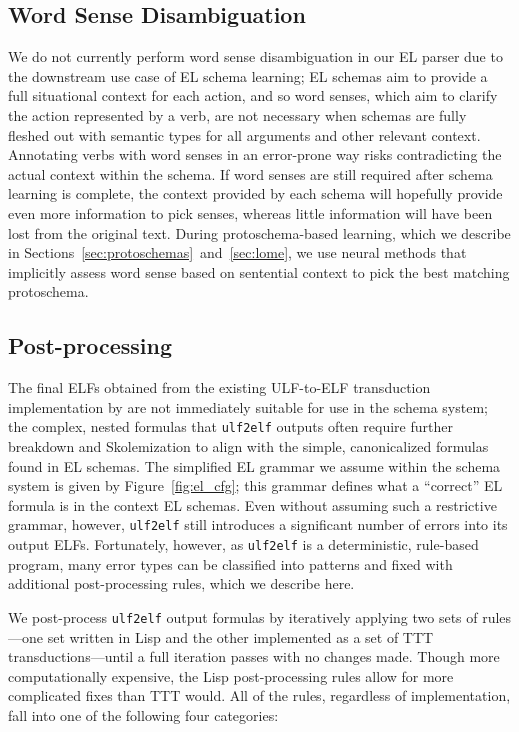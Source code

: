 \subsection{Word Sense Disambiguation}
\label{sec:wsd}
We do not currently perform word sense disambiguation in our EL parser due to the downstream use case of EL schema learning; EL schemas aim to provide a full situational context for each action, and so word senses, which aim to clarify the action represented by a verb, are not necessary when schemas are fully fleshed out with semantic types for all arguments and other relevant context. Annotating verbs with word senses in an error-prone way risks contradicting the actual context within the schema. If word senses are still required after schema learning is complete, the context provided by each schema will hopefully provide even more information to pick senses, whereas little information will have been lost from the original text. During protoschema-based learning, which we describe in Sections~\ref{sec:protoschemas}~and~\ref{sec:lome}, we use neural methods that implicitly assess word sense based on sentential context to pick the best matching protoschema.

\subsection{Post-processing}
\label{subsec:postproc}
The final ELFs obtained from the existing ULF-to-ELF transduction implementation by \citet{schubert-2014-treebank} are not immediately suitable for use in the schema system; the complex, nested formulas that \texttt{ulf2elf} outputs often require further breakdown and Skolemization to align with the simple, canonicalized formulas found in EL schemas. The simplified EL grammar we assume within the schema system is given by Figure~\ref{fig:el_cfg}; this grammar defines what a ``correct'' EL formula is in the context EL schemas. Even without assuming such a restrictive grammar, however, \texttt{ulf2elf} still introduces a significant number of errors into its output ELFs. Fortunately, however, as \texttt{ulf2elf} is a deterministic, rule-based program, many error types can be classified into patterns and fixed with additional post-processing rules, which we describe here.

We post-process \texttt{ulf2elf} output formulas by iteratively applying two sets of rules---one set written in Lisp and the other implemented as a set of TTT transductions---until a full iteration passes with no changes made. Though more computationally expensive, the Lisp post-processing rules allow for more complicated fixes than TTT would. All of the rules, regardless of implementation, fall into one of the following four categories:

